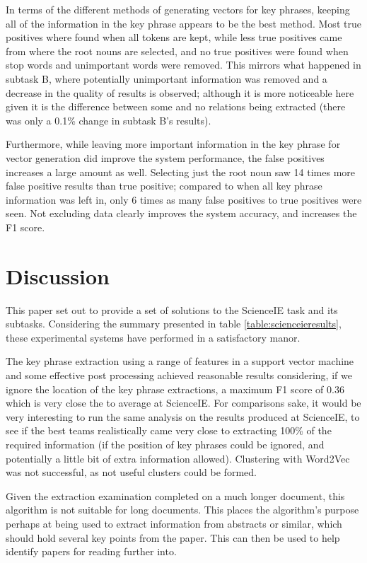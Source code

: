 In terms of the different methods of generating vectors for key phrases, keeping all of the information in the key phrase appears to be the best method. Most true positives where found when all tokens are kept, while less true positives came from where the root nouns are selected, and no true positives were found when stop words and unimportant words were removed. This mirrors what happened in subtask B, where potentially unimportant information was removed and a decrease in the quality of results is observed; although it is more noticeable here given it is the difference between some and no relations being extracted (there was only a 0.1\% change in subtask B's results).

Furthermore, while leaving more important information in the key phrase for vector generation did improve the system performance, the false positives increases a large amount as well. Selecting just the root noun saw 14 times more false positive results than true positive; compared to when all key phrase information was left in, only 6 times as many false positives to true positives were seen. Not excluding data clearly improves the system accuracy, and increases the F1 score.

\section{Discussion}
This paper set out to provide a set of solutions to the ScienceIE task and its subtasks. Considering the summary presented in table \ref{table:scienceieresults}, these experimental systems have performed in a satisfactory manor. 

The key phrase extraction using a range of features in a support vector machine and some effective post processing achieved reasonable results considering, if we ignore the location of the key phrase extractions, a maximum F1 score of 0.36 which is very close the to average at ScienceIE. For comparisons sake, it would be very interesting to run the same analysis on the results produced at ScienceIE, to see if the best teams realistically came very close to extracting 100\% of the required information (if the position of key phrases could be ignored, and potentially a little bit of extra information allowed). Clustering with Word2Vec was not successful, as not useful clusters could be formed. 

Given the extraction examination completed on a much longer document, this algorithm is not suitable for long documents. This places the algorithm's purpose perhaps at being used to extract information from abstracts or similar, which should hold several key points from the paper. This can then be used to help identify papers for reading further into.


